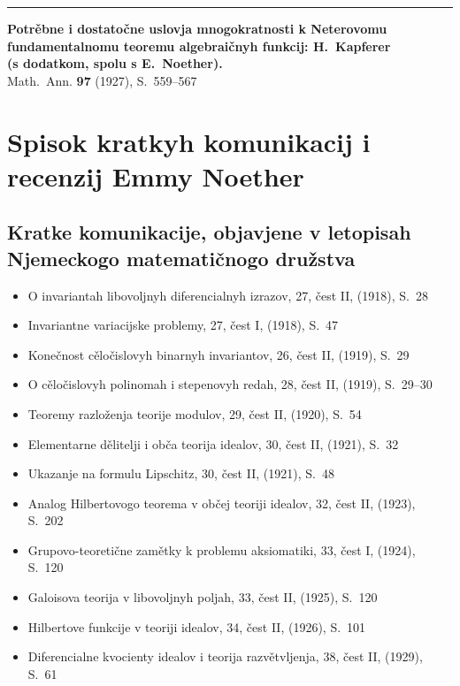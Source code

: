 \documentclass[11pt]{article}
\newcommand{\foreign}[1]{#1}
\begin{document}
\vspace{1em}
\noindent\rule{\textwidth}{0.4pt}
\vspace{0.5em}

\noindent\textbf{Potrěbne i dostatočne uslovja mnogokratnosti k Neterovomu}\\
\textbf{fundamentalnomu teoremu algebraičnyh funkcij: H.\ Kapferer}\\
\textbf{(s dodatkom, spolu s E.\ Noether).}\\
\foreign{Math.\ Ann.} \textbf{97} (1927), S.~559--567

\newpage
\section*{Spisok kratkyh komunikacij i recenzij Emmy Noether}

\subsection*{Kratke komunikacije, objavjene v letopisah Njemeckogo matematičnogo družstva}

\begin{itemize}[leftmargin=1.5em,itemsep=0.2em]
\item O invariantah libovoljnyh diferencialnyh izrazov, 27, čest II, (1918), S.~28
\item Invariantne variacijske problemy, 27, čest I, (1918), S.~47
\item Konečnost cěločislovyh binarnyh invariantov, 26, čest II, (1919), S.~29
\item O cěločislovyh polinomah i stepenovyh redah, 28, čest II, (1919), S.~29--30
\item Teoremy razloženja teorije modulov, 29, čest II, (1920), S.~54
\item Elementarne dělitelji i obča teorija idealov, 30, čest II, (1921), S.~32
\item Ukazanje na formulu Lipschitz, 30, čest II, (1921), S.~48
\item Analog Hilbertovogo teorema v občej teoriji idealov, 32, čest II, (1923), S.~202
\item Grupovo-teoretične zamětky k problemu aksiomatiki, 33, čest I, (1924), S.~120
\item Galoisova teorija v libovoljnyh poljah, 33, čest II, (1925), S.~120
\item Hilbertove funkcije v teoriji idealov, 34, čest II, (1926), S.~101
\item Diferencialne kvocienty idealov i teorija razvětvljenja, 38, čest II, (1929), S.~61
\end{itemize}
\end{document}

